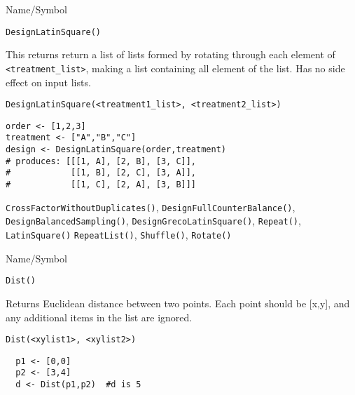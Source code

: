 \rl


\begin{desc}{Name/Symbol}
\item[Name/Symbol]	\verb+DesignLatinSquare()+

\item[Description] This returns return a list of lists formed by
  rotating through each element of \verb+<treatment_list>+, making a
  list containing all element of the list. Has no side effect on input
  lists.  

\item[Usage]
\begin{verbatim}
DesignLatinSquare(<treatment1_list>, <treatment2_list>)
\end{verbatim}

\item[Example]
\begin{verbatim}
order <- [1,2,3]
treatment <- ["A","B","C"]
design <- DesignLatinSquare(order,treatment)
# produces: [[[1, A], [2, B], [3, C]],
#            [[1, B], [2, C], [3, A]],
#            [[1, C], [2, A], [3, B]]]
\end{verbatim}

\item[See Also] \verb+CrossFactorWithoutDuplicates()+,
  \verb+DesignFullCounterBalance()+, \verb+DesignBalancedSampling()+,
  \verb+DesignGrecoLatinSquare()+, \verb+Repeat()+, \verb+LatinSquare()+
  \verb+RepeatList()+, \verb+Shuffle()+, \verb+Rotate()+
\end{desc}

\rl


\begin{desc}{Name/Symbol}
\item[Name/Symbol]	\verb+Dist()+

\item[Description] Returns Euclidean distance between two points.
  Each point should be [x,y], and any additional items in the list are
  ignored.  


\item[Usage]
\begin{verbatim}
Dist(<xylist1>, <xylist2>)
\end{verbatim}

\item[Example]	
\begin{verbatim}
  p1 <- [0,0]
  p2 <- [3,4]
  d <- Dist(p1,p2)  #d is 5
\end{verbatim}
\item[See Also]	
\end{desc}

